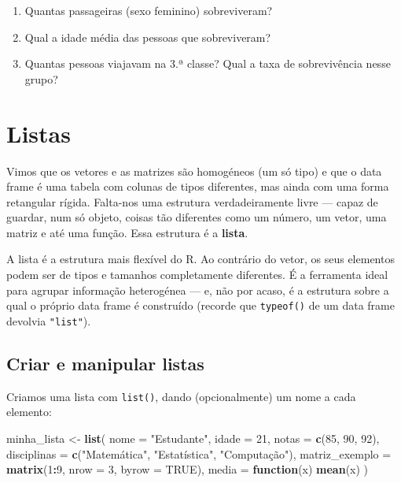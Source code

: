 \documentclass[
  portuguese,
  11pt,
  openany]{book}
\newenvironment{Shaded}{\begin{snugshade}}{\end{snugshade}}
\newcommand{\AttributeTok}[1]{\textcolor[rgb]{0.13,0.29,0.53}{#1}}
\newcommand{\ConstantTok}[1]{\textcolor[rgb]{0.56,0.35,0.01}{#1}}
\newcommand{\ControlFlowTok}[1]{\textcolor[rgb]{0.13,0.29,0.53}{\textbf{#1}}}
\newcommand{\DecValTok}[1]{\textcolor[rgb]{0.00,0.00,0.81}{#1}}
\newcommand{\FunctionTok}[1]{\textcolor[rgb]{0.13,0.29,0.53}{\textbf{#1}}}
\newcommand{\NormalTok}[1]{#1}
\newcommand{\OtherTok}[1]{\textcolor[rgb]{0.56,0.35,0.01}{#1}}
\newcommand{\SpecialCharTok}[1]{\textcolor[rgb]{0.81,0.36,0.00}{\textbf{#1}}}
\newcommand{\StringTok}[1]{\textcolor[rgb]{0.31,0.60,0.02}{#1}}
\providecommand{\tightlist}{%
  \setlength{\itemsep}{0pt}\setlength{\parskip}{0pt}}
\begin{document}
\begin{enumerate}
\def\labelenumi{(\alph{enumi})}
\setcounter{enumi}{1}
\tightlist
\item
  Quantas passageiras (sexo feminino) sobreviveram?
\item
  Qual a idade média das pessoas que sobreviveram?
\item
  Quantas pessoas viajavam na 3.ª classe? Qual a taxa de sobrevivência nesse
  grupo?
\end{enumerate}

\section{Listas}\label{listas}

Vimos que os vetores e as matrizes são homogéneos (um só tipo) e que o data frame
é uma tabela com colunas de tipos diferentes, mas ainda com uma forma retangular
rígida. Falta-nos uma estrutura verdadeiramente livre --- capaz de guardar, num só
objeto, coisas tão diferentes como um número, um vetor, uma matriz e até uma
função. Essa estrutura é a \textbf{lista}.

A lista é a estrutura mais flexível do R. Ao contrário do vetor, os seus
elementos podem ser de tipos e tamanhos completamente diferentes. É a ferramenta
ideal para agrupar informação heterogénea --- e, não por acaso, é a estrutura sobre
a qual o próprio data frame é construído (recorde que \texttt{typeof()} de um data frame
devolvia \texttt{"list"}).

\subsection{Criar e manipular listas}\label{criar-e-manipular-listas}

Criamos uma lista com \texttt{list()}, dando (opcionalmente) um nome a cada elemento:

\begin{Shaded}
\begin{Highlighting}[]
\NormalTok{minha\_lista }\OtherTok{\textless{}{-}} \FunctionTok{list}\NormalTok{(}
  \AttributeTok{nome =} \StringTok{"Estudante"}\NormalTok{,}
  \AttributeTok{idade =} \DecValTok{21}\NormalTok{,}
  \AttributeTok{notas =} \FunctionTok{c}\NormalTok{(}\DecValTok{85}\NormalTok{, }\DecValTok{90}\NormalTok{, }\DecValTok{92}\NormalTok{),}
  \AttributeTok{disciplinas =} \FunctionTok{c}\NormalTok{(}\StringTok{"Matemática"}\NormalTok{, }\StringTok{"Estatística"}\NormalTok{, }\StringTok{"Computação"}\NormalTok{),}
  \AttributeTok{matriz\_exemplo =} \FunctionTok{matrix}\NormalTok{(}\DecValTok{1}\SpecialCharTok{:}\DecValTok{9}\NormalTok{, }\AttributeTok{nrow =} \DecValTok{3}\NormalTok{, }\AttributeTok{byrow =} \ConstantTok{TRUE}\NormalTok{),}
  \AttributeTok{media =} \ControlFlowTok{function}\NormalTok{(x) }\FunctionTok{mean}\NormalTok{(x)}
\NormalTok{)}
\end{Highlighting}
\end{Shaded}
\end{document}
